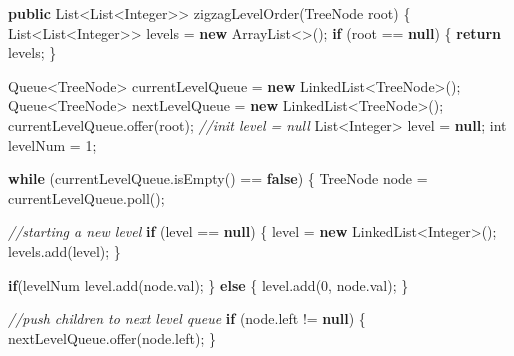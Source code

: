\documentclass[]{book}
\newenvironment{Shaded}{\begin{snugshade}}{\end{snugshade}}
\newcommand{\BuiltInTok}[1]{#1}
\newcommand{\CommentTok}[1]{\textcolor[rgb]{0.56,0.35,0.01}{\textit{#1}}}
\newcommand{\DataTypeTok}[1]{\textcolor[rgb]{0.13,0.29,0.53}{#1}}
\newcommand{\DecValTok}[1]{\textcolor[rgb]{0.00,0.00,0.81}{#1}}
\newcommand{\FunctionTok}[1]{\textcolor[rgb]{0.00,0.00,0.00}{#1}}
\newcommand{\KeywordTok}[1]{\textcolor[rgb]{0.13,0.29,0.53}{\textbf{#1}}}
\newcommand{\NormalTok}[1]{#1}
\begin{document}
\begin{Shaded}
\begin{Highlighting}[]
\KeywordTok{public} \BuiltInTok{List}\NormalTok{<}\BuiltInTok{List}\NormalTok{<}\BuiltInTok{Integer}\NormalTok{>> }\FunctionTok{zigzagLevelOrder}\NormalTok{(}\BuiltInTok{TreeNode}\NormalTok{ root) \{}
    \BuiltInTok{List}\NormalTok{<}\BuiltInTok{List}\NormalTok{<}\BuiltInTok{Integer}\NormalTok{>> levels = }\KeywordTok{new} \BuiltInTok{ArrayList}\NormalTok{<>();}
    \KeywordTok{if}\NormalTok{ (root == }\KeywordTok{null}\NormalTok{) \{}
        \KeywordTok{return}\NormalTok{ levels;}
\NormalTok{    \}}

    \BuiltInTok{Queue}\NormalTok{<}\BuiltInTok{TreeNode}\NormalTok{> currentLevelQueue = }\KeywordTok{new} \BuiltInTok{LinkedList}\NormalTok{<}\BuiltInTok{TreeNode}\NormalTok{>();}
    \BuiltInTok{Queue}\NormalTok{<}\BuiltInTok{TreeNode}\NormalTok{> nextLevelQueue = }\KeywordTok{new} \BuiltInTok{LinkedList}\NormalTok{<}\BuiltInTok{TreeNode}\NormalTok{>();}
\NormalTok{    currentLevelQueue.}\FunctionTok{offer}\NormalTok{(root);}
    \CommentTok{//init level = null}
    \BuiltInTok{List}\NormalTok{<}\BuiltInTok{Integer}\NormalTok{> level = }\KeywordTok{null}\NormalTok{;}
    \DataTypeTok{int}\NormalTok{ levelNum = }\DecValTok{1}\NormalTok{;}

    \KeywordTok{while}\NormalTok{ (currentLevelQueue.}\FunctionTok{isEmpty}\NormalTok{() == }\KeywordTok{false}\NormalTok{) \{}
        \BuiltInTok{TreeNode}\NormalTok{ node = currentLevelQueue.}\FunctionTok{poll}\NormalTok{();}

        \CommentTok{//starting a new level}
        \KeywordTok{if}\NormalTok{ (level == }\KeywordTok{null}\NormalTok{) \{}
\NormalTok{            level = }\KeywordTok{new} \BuiltInTok{LinkedList}\NormalTok{<}\BuiltInTok{Integer}\NormalTok{>();}
\NormalTok{            levels.}\FunctionTok{add}\NormalTok{(level);}
\NormalTok{        \}}

        \KeywordTok{if}\NormalTok{(levelNum %
\NormalTok{            level.}\FunctionTok{add}\NormalTok{(node.}\FunctionTok{val}\NormalTok{);}
\NormalTok{        \} }\KeywordTok{else}\NormalTok{ \{}
\NormalTok{            level.}\FunctionTok{add}\NormalTok{(}\DecValTok{0}\NormalTok{, node.}\FunctionTok{val}\NormalTok{);}
\NormalTok{        \}}

        \CommentTok{//push children to next level queue}
        \KeywordTok{if}\NormalTok{ (node.}\FunctionTok{left}\NormalTok{ != }\KeywordTok{null}\NormalTok{) \{}
\NormalTok{            nextLevelQueue.}\FunctionTok{offer}\NormalTok{(node.}\FunctionTok{left}\NormalTok{);}
\NormalTok{        \}}

}
\end{Highlighting}
\end{Shaded}
\end{document}
